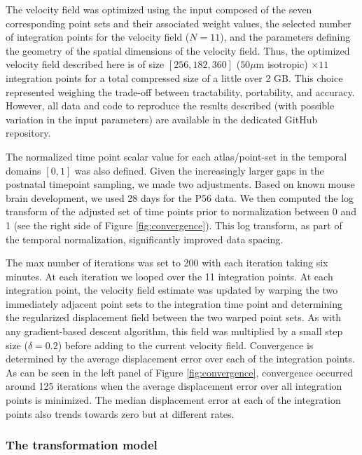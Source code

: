 \documentclass[
  12pt,
]{article}
\begin{document}
The velocity field was optimized using the input composed of the seven
corresponding point sets and their associated weight values, the
selected number of integration points for the velocity field (\(N=11\)),
and the parameters defining the geometry of the spatial dimensions of
the velocity field. Thus, the optimized velocity field described here is
of size \([256, 182, 360]\) (\(50 \mu\)m isotropic) \(\times 11\)
integration points for a total compressed size of a little over 2 GB.
This choice represented weighing the trade-off between tractability,
portability, and accuracy. However, all data and code to reproduce the
results described (with possible variation in the input parameters) are
available in the dedicated GitHub repository.

The normalized time point scalar value for each atlas/point-set in the
temporal domains \([0, 1]\) was also defined. Given the increasingly
larger gaps in the postnatal timepoint sampling, we made two
adjustments. Based on known mouse brain development, we used 28 days for
the P56 data. We then computed the log transform of the adjusted set of
time points prior to normalization between 0 and 1 (see the right side
of Figure \ref{fig:convergence}). This log transform, as part of the
temporal normalization, significantly improved data spacing.

The max number of iterations was set to 200 with each iteration taking
six minutes. At each iteration we looped over the 11 integration points.
At each integration point, the velocity field estimate was updated by
warping the two immediately adjacent point sets to the integration time
point and determining the regularized displacement field between the two
warped point sets. As with any gradient-based descent algorithm, this
field was multiplied by a small step size (\(\delta = 0.2\)) before
adding to the current velocity field. Convergence is determined by the
average displacement error over each of the integration points. As can
be seen in the left panel of Figure \ref{fig:convergence}, convergence
occurred around 125 iterations when the average displacement error over
all integration points is minimized. The median displacement error at
each of the integration points also trends towards zero but at different
rates.

\hypertarget{the-transformation-model}{%
\subsubsection{The transformation
model}\label{the-transformation-model}}
\end{document}

